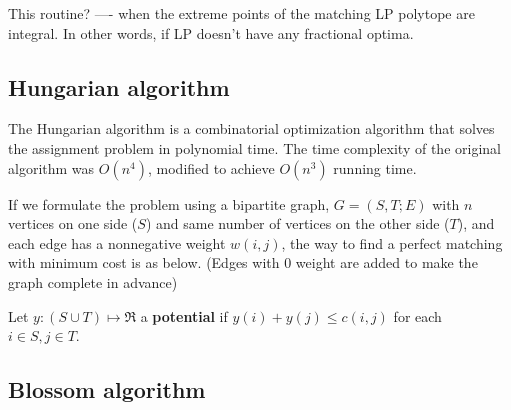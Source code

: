 This routine? ---- when the extreme points of the matching LP polytope are integral. In other words, if LP doesn't have any fractional optima. 



\subsection{Hungarian algorithm}
The Hungarian algorithm is a combinatorial optimization algorithm that solves the assignment problem in polynomial time. 
The time complexity of the original algorithm was $O(n^4)$, modified to achieve $O(n^3)$ running time. 

If we formulate the problem using a bipartite graph, $G=(S, T;E)$ with $n$ vertices on one side ($S$) and same number of vertices on the other side ($T$), and each edge has a nonnegative weight $w(i, j)$, the way to find a perfect matching with minimum cost is as below. (Edges with 0 weight are added to make the graph complete in advance)

Let $y:(S \cup T) \mapsto \Re$ a \textbf{potential} if $y(i) + y(j) \leq c(i,j)$ for each $i \in S, j \in T$.

\subsection{Blossom algorithm}
